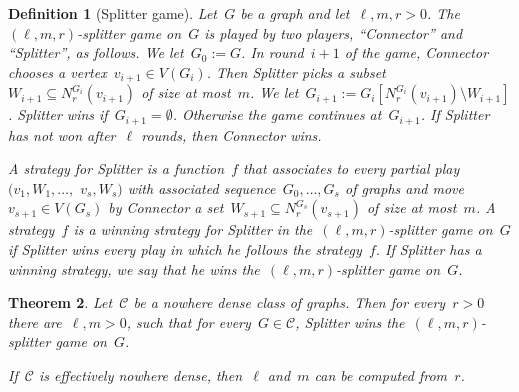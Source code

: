 \documentclass[11pt]{article}
\newtheorem{theorem}{Theorem}[section]
\newtheorem{definition}[theorem]{Definition}
\numberwithin{equation}{section}
\newcommand{\CCC}{\mathcal{C}} \newcommand{\DDD}{\mathcal{D}}
\begin{document}
\begin{definition}[Splitter game]
  Let~$G$ be a graph and
  let~${\ell},m,r>0$. The~$({\ell},m,r)$-\emph{splitter game} on~$G$
  is played by two players, ``Connector'' and ``Splitter'', as
  follows. We let~$G_0:=G$. In round~$i+1$ of the game, Connector
  chooses a vertex~$v_{i+1}\in V(G_i)$. Then Splitter picks a
  subset~$W_{i+1}\subseteq N_r^{G_i}(v_{i+1})$ of size at most~$m$. We
  let~$G_{i+1}:=G_i[N_r^{G_i}(v_{i+1})\setminus W_{i+1}]$. Splitter
  wins if~$G_{i+1}=\emptyset$. Otherwise the game continues
  at~$G_{i+1}$. If Splitter has not won after~${\ell}$ rounds, then
  Connector wins.

  A \emph{strategy} for Splitter is a function~$f$ that associates
  to every partial play $(v_1, W_1, \dots,$ $v_s, W_s)$ with
  associated sequence~$G_0, \dots, G_s$ of graphs and move~$v_{s+1}\in
  V(G_s)$ by Connector a set~$W_{s+1}\subseteq N_r^{G_s}(v_{s+1})$ of
  size at most~$m$.  A strategy~$f$ is a \emph{winning strategy} for
  Splitter in the~$({\ell},m,r)$-splitter game on~$G$ if Splitter wins
  every play in which he follows the strategy~$f$. If Splitter has a
  winning strategy, we say that he \emph{wins}
  the~$({\ell},m,r)$-splitter game on~$G$.
\end{definition}

\begin{theorem}\label{thm:splittergame}
  Let~$\CCC$ be a nowhere dense class of graphs. Then for
  every~$r>0$ there are~${\ell},m>0$, such that for
  every~$G\in\CCC$, Splitter wins the~$({\ell},m,r)$-splitter game
  on~$G$.

  If~$\CCC$ is effectively nowhere dense, then~${\ell}$ and~$m$ can be
  computed from~$r$.
\end{theorem}
\end{document}
